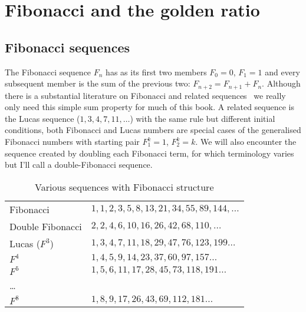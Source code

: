 
\chapter{Fibonacci and the golden ratio}

\label{CH:0}
\label{ch:0}
\section{Fibonacci sequences}

The Fibonacci sequence $F_n$ has as its first two members  $F_0=0$, $F_1=1$ and every subsequent member is the sum of the previous two:  $F_{n+2}=F_{n+1}+F_{n}$. 
Although there is a substantial literature on Fibonacci and related sequences~\cite{vajdaFibonacciLucasNumbers2008} we really only need this simple sum property for much of this book. 
A related sequence is the Lucas sequence  ($1,3,4,7,11,\ldots$) with the same rule but different initial conditions, both Fibonacci and Lucas numbers are special cases of the generalised Fibonacci numbers with starting pair $F^k_1=1$, $F^k_2=k$. We will also encounter the sequence created by doubling each Fibonacci term, for which terminology varies but I'll call a double-Fibonacci sequence. 
%
\begin{table}[ht]
	\begin{center}
		\begin{tabular}{ll}
			\hline
			Fibonacci  &  $1,1,2,3,5,8,13,21,34,55,89,144,\ldots$ 
			\\
			Double Fibonacci & $2,2,4,6,10,16,26,42,68,110,\ldots$
			\\
			Lucas ($F^3$)&      $ 1,3,4,7,11,18,29,47,76,123,199\ldots$
			\\
			$F^4$  & $1,4,5,9,14,23,37,60,97,157\ldots$
			\\
			$F^5$ & $1,5,6,11,17,28,45,73,118,191\ldots$
			\\
			\ldots &
			\\
			$F^8$ & $1,8,9,17,26,43,69,112,181\ldots$
			\\
			\hline
		\end{tabular}
		\caption{Various sequences with Fibonacci structure}
		\label{tab:sequences}
	\end{center}
\end{table}
%

